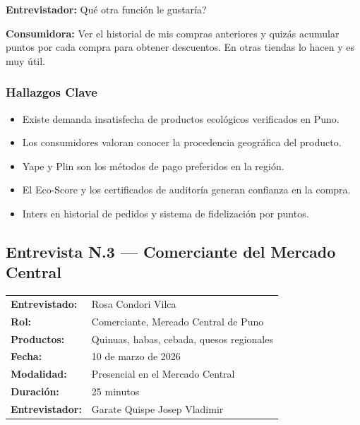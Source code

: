 \documentclass[12pt,a4paper]{article}
\begin{document}
\textbf{Entrevistador:} \textquestiondown Qu\'e otra funci\'on le gustar\'ia?

\textbf{Consumidora:} Ver el historial de mis compras anteriores y quiz\'as acumular
puntos por cada compra para obtener descuentos. En otras tiendas lo hacen y es
muy \'util.

\subsubsection{Hallazgos Clave}

\begin{itemize}[leftmargin=1.5cm]
  \item Existe demanda insatisfecha de productos ecol\'ogicos verificados en Puno.
  \item Los consumidores valoran conocer la procedencia geogr\'afica del producto.
  \item Yape y Plin son los m\'etodos de pago preferidos en la regi\'on.
  \item El Eco-Score y los certificados de auditor\'ia generan confianza en la compra.
  \item Inters en historial de pedidos y sistema de fidelizaci\'on por puntos.
\end{itemize}

\subsection{Entrevista N.\textdegree{}3 --- Comerciante del Mercado Central}

\begin{center}
\begin{tabular}{|L{3.8cm}|L{9.7cm}|}
\hline
{}
 \\
\hline
\textbf{Entrevistado:}  & Rosa Condori Vilca \\
\hline
\textbf{Rol:}           & Comerciante, Mercado Central de Puno \\
\hline
\textbf{Productos:}     & Quinuas, habas, cebada, quesos regionales \\
\hline
\textbf{Fecha:}         & 10 de marzo de 2026 \\
\hline
\textbf{Modalidad:}     & Presencial en el Mercado Central \\
\hline
\textbf{Duraci\'on:}    & 25 minutos \\
\hline
\textbf{Entrevistador:} & Garate Quispe Josep Vladimir \\
\hline
\end{tabular}
\end{center}
\end{document}
